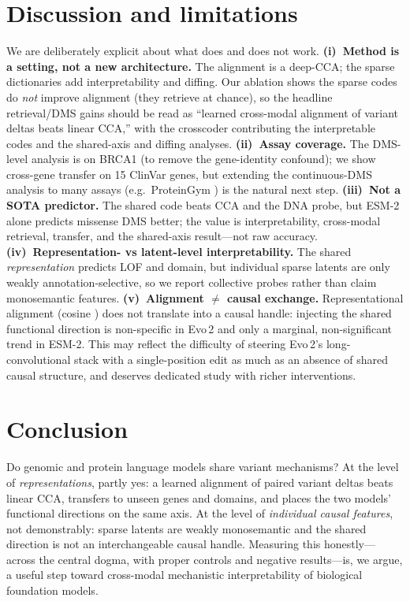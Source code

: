 \documentclass[10pt]{article}
\begin{document}
\section{Discussion and limitations}
We are deliberately explicit about what does and does not work. \textbf{(i)~Method is a setting,
not a new architecture.} The alignment is a deep-CCA; the sparse dictionaries add interpretability
and diffing. Our ablation shows the sparse codes do \emph{not} improve alignment
(they retrieve at chance), so the headline retrieval/DMS gains should be read as ``learned
cross-modal alignment of variant deltas beats linear CCA,'' with the crosscoder contributing the
interpretable codes and the shared-axis and diffing analyses. \textbf{(ii)~Assay coverage.} The
DMS-level analysis is on BRCA1 (to remove the gene-identity confound); we show cross-gene transfer
on 15 ClinVar genes, but extending the continuous-DMS analysis to many assays (e.g.\ ProteinGym
\citep{notin2023proteingym}) is the natural next step. \textbf{(iii)~Not a SOTA predictor.} The
shared code beats CCA and the DNA probe, but ESM-2 alone predicts missense DMS better; the value
is interpretability, cross-modal retrieval, transfer, and the shared-axis result---not raw
accuracy. \textbf{(iv)~Representation- vs latent-level interpretability.} The shared
\emph{representation} predicts LOF and domain, but individual sparse latents are only weakly
annotation-selective, so we report collective probes rather than claim monosemantic features.
\textbf{(v)~Alignment $\neq$ causal exchange.} Representational alignment (cosine \cosDms{}) does
not translate into a causal handle: injecting the shared functional direction is non-specific in
Evo\,2 and only a marginal, non-significant trend in ESM-2. This may reflect the difficulty of
steering Evo\,2's long-convolutional stack with a single-position edit as much as an absence of
shared causal structure, and deserves dedicated study with richer interventions.

\section{Conclusion}
Do genomic and protein language models share variant mechanisms? At the level of
\emph{representations}, partly yes: a learned alignment of paired variant deltas beats linear CCA,
transfers to unseen genes and domains, and places the two models' functional directions on the
same axis. At the level of \emph{individual causal features}, not demonstrably: sparse latents are
weakly monosemantic and the shared direction is not an interchangeable causal handle. Measuring
this honestly---across the central dogma, with proper controls and negative results---is, we
argue, a useful step toward cross-modal mechanistic interpretability of biological foundation
models.

\small


\end{document}

